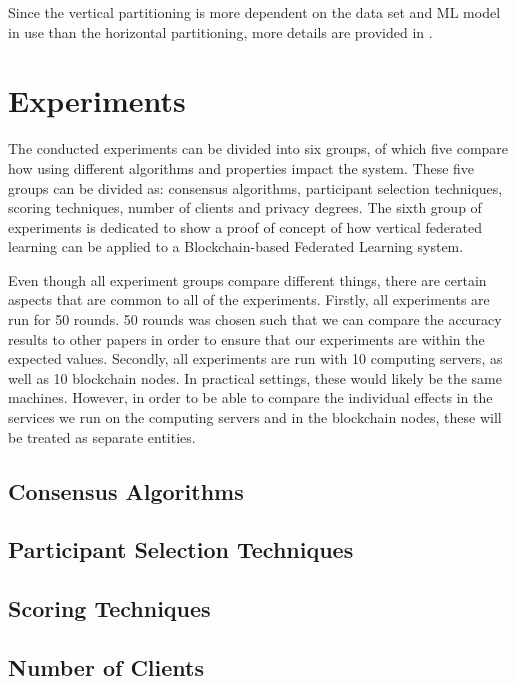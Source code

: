 Since the vertical partitioning is more dependent on the data set and ML model in use than the horizontal partitioning, more details are provided in .

\section{Experiments}

The conducted experiments can be divided into six groups, of which five compare how using different algorithms and properties impact the system. These five groups can be divided as: consensus algorithms, participant selection techniques, scoring techniques, number of clients and privacy degrees. The sixth group of experiments is dedicated to show a proof of concept of how vertical federated learning can be applied to a Blockchain-based Federated Learning system.

Even though all experiment groups compare different things, there are certain aspects that are common to all of the experiments. Firstly, all experiments are run for 50 rounds. 50 rounds was chosen such that we can compare the accuracy results to other papers in order to ensure that our experiments are within the expected values. Secondly, all experiments are run with 10 computing servers, as well as 10 blockchain nodes. In practical settings, these would likely be the same machines. However, in order to be able to compare the individual effects in the services we run on the computing servers and in the blockchain nodes, these will be treated as separate entities.

\subsection{Consensus Algorithms}

\todo{}

\subsection{Participant Selection Techniques}

\todo{}

\subsection{Scoring Techniques}

\todo{}

\subsection{Number of Clients}

